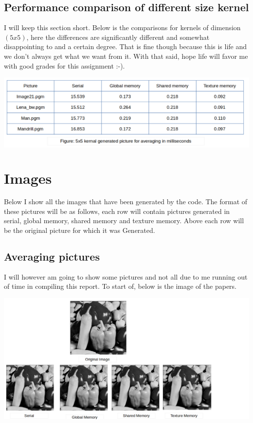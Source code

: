 \subsection*{Performance comparison of different size kernel}
I will keep this section short. Below is the comparisons for kernels of dimension $(5 x 5)$, here the differences are significantly different and somewhat disappointing to and a certain degree. That is fine though because this is life and we don't always get what we want from it. With that said, hope life will favor me with good grades for this assignment :-).

\includegraphics[scale=0.5]{Performance/averaging5.png}

\section*{Images}
Below I show all the images that have been generated by the code. The format of these pictures will be as follows, each row will contain pictures generated in serial, global memory, shared memory and texture memory. Above each row will be the original picture for which it was Generated.

\subsection*{Averaging pictures}
I will however am going to show some pictures and not all due to me running out of time in compiling this report. To start of, below is the image of the papers.

\includegraphics[scale=0.5]{images/image21Ave.png}
 
